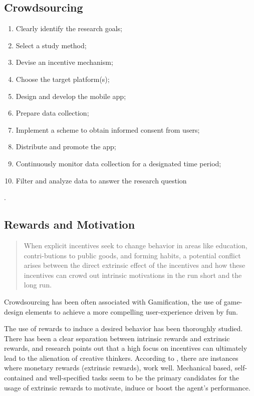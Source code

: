 \documentclass[letterpaper]{article}
\begin{document}
\subsection{Crowdsourcing}




\begin{enumerate}
		
\item Clearly identify the research goals; \item Select a study method; \item Devise an incentive mechanism;  \item Choose the target platform(s); \item Design and develop the mobile app; \item Prepare data collection; \item Implement a scheme to obtain informed consent from users; \item Distribute and promote the app; \item Continuously monitor data collection for a designated time period; \item Filter and analyze data to answer the research question
\end{enumerate} 
\cite{Henze2013}.


\subsection{Rewards and Motivation}



\begin{quote}
When explicit incentives seek to change behavior in areas like education, contri-butions to public goods, and forming habits, a potential conflict arises between
the direct extrinsic effect of the incentives and how these incentives can crowd
out intrinsic motivations in the run short and the long run.
\end{quote}
\cite{Gneezy2011}


Crowdsourcing has been often associated with Gamification, the use of game-design elements to achieve a more compelling user-experience driven by fun.


The use of rewards to induce a desired behavior has been thoroughly studied. 
There has been a clear separation between intrinsic rewards and extrinsic rewards, and research points out that a high focus on incentives can ultimately lead to the alienation of creative thinkers. 
According to \cite{Gneezy2011}, there are instances where monetary rewards (extrinsic rewards), work well. Mechanical based, self-contained and well-specified tasks seem to be the primary candidates for the usage of extrinsic rewards to motivate, induce or boost the agent's performance\cite{Ariely2009}.
\end{document}
